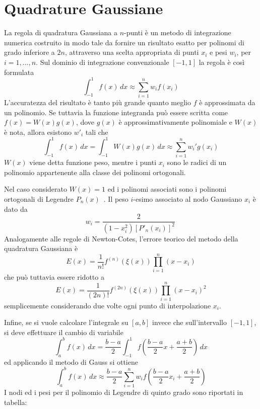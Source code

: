\section{Quadrature Gaussiane}
La regola di quadratura Gaussiana a $n$-punti è un metodo di integrazione numerica costruito in modo tale da fornire un risultato esatto per polinomi di grado inferiore a $2n$, attraverso una scelta appropriata di punti $x_i$ e pesi $w_i$, per $i=1,...,n$. Sul dominio di integrazione convenzionale $[-1,1]$ la regola è così formulata
$$\int_{-1}^1 f(x)\,dx \approx \sum_{i=1}^n w_i f(x_i)$$
L'accuratezza del risultato è tanto più grande quanto meglio $f$ è approssimata da un polinomio. Se tuttavia la funzione integranda può essere scritta come $f(x)=W(x)g(x)$, dove $g(x)$ è approssimativamente polinomiale e $W(x)$ è nota, allora esistono $w'_i$ tali che
$$\int_{-1}^1 f(x)\,dx = \int_{-1}^1 W(x) g(x)\,dx \approx \sum_{i=1}^n w_i' g(x_i)$$
$W(x)$ viene detta funzione peso, mentre i punti $x_i$ sono le radici di un polinomio appartenente alla classe dei polinomi ortogonali.

Nel caso considerato $W(x)=1$ ed i polinomi associati sono i polinomi ortogonali di Legendre $P_n(x)$~\cite{uno}. Il peso $i$-esimo associato al nodo Gaussiano $x_i$ è dato da
$$ w_i = \frac{2}{\left( 1-x_i^2 \right) [P'_n(x_i)]^2} \,\!$$
Analogamente alle regole di Newton-Cotes, l'errore teorico del metodo della quadratura Gaussiana è
$$E(x)=\frac{1}{n!}f^{(n)}(\xi(x))\prod_{i=1}^n(x-x_i)$$
che può tuttavia essere ridotto a
$$E(x)=\frac{1}{(2n)!}f^{(2n)}(\xi(x))\prod_{i=1}^n(x-x_i)^2$$
semplicemente considerando due volte ogni punto di interpolazione $x_i$.

Infine, se si vuole calcolare l'integrale su $[a,b]$ invece che sull'intervallo $[-1,1]$, si deve effettuare il cambio di variabile
$$\int_a^b f(x)\,dx = \frac{b-a}{2} \int_{-1}^1 f\left(\frac{b-a}{2}x + \frac{a+b}{2}\right)\,dx $$
ed applicando il metodo di Gauss si ottiene
$$\int_a^b f(x)\,dx \approx \frac{b-a}{2} \sum_{i=1}^n w_i f\left(\frac{b-a}{2}x_i + \frac{a+b}{2}\right)$$
I nodi ed i pesi per il polinomio di Legendre di quinto grado sono riportati in tabella:\\
\begin{center}
\end{center}

